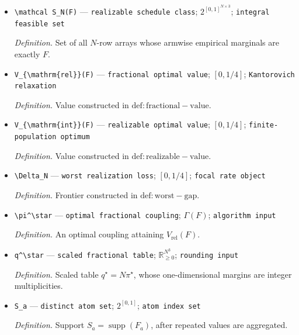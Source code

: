 \documentclass{article}
\begin{document}
\begin{itemize}
  \par\smallskip\noindent\emph{Definition.} Cost \(C(y)=(\sum_{a\in\mathbb A}c_a y_a)^2\).
  \item \texttt{\textbackslash{}\allowbreak{}mathcal S\_\allowbreak{}N(F)} --- \texttt{realizable schedule class}; \(2^{[0,1]^{N\times3}}\); \texttt{integral feasible set}
  \par\smallskip\noindent\emph{Definition.} Set of all \(N\)-row arrays whose armwise empirical marginals are exactly \(F\).
  \item \texttt{V\_\allowbreak{}\{\textbackslash{}\allowbreak{}mathrm\{rel\}\allowbreak{}\}\allowbreak{}(F)} --- \texttt{fractional optimal value}; \([0,1/4]\); \texttt{Kantorovich relaxation}
  \par\smallskip\noindent\emph{Definition.} Value constructed in \(\mathrm{def:fractional-value}\).
  \item \texttt{V\_\allowbreak{}\{\textbackslash{}\allowbreak{}mathrm\{int\}\allowbreak{}\}\allowbreak{}(F)} --- \texttt{realizable optimal value}; \([0,1/4]\); \texttt{finite-\allowbreak{}population optimum}
  \par\smallskip\noindent\emph{Definition.} Value constructed in \(\mathrm{def:realizable-value}\).
  \item \texttt{\textbackslash{}\allowbreak{}Delta\_\allowbreak{}N} --- \texttt{worst realization loss}; \([0,1/4]\); \texttt{focal rate object}
  \par\smallskip\noindent\emph{Definition.} Frontier constructed in \(\mathrm{def:worst-gap}\).
  \item \texttt{\textbackslash{}\allowbreak{}pi\textasciicircum{}\textbackslash{}\allowbreak{}star} --- \texttt{optimal fractional coupling}; \(\Gamma(F)\); \texttt{algorithm input}
  \par\smallskip\noindent\emph{Definition.} An optimal coupling attaining \(V_{\mathrm{rel}}(F)\).
  \item \texttt{q\textasciicircum{}\textbackslash{}\allowbreak{}star} --- \texttt{scaled fractional table}; \(\mathbb R_{\ge0}^{N^3}\); \texttt{rounding input}
  \par\smallskip\noindent\emph{Definition.} Scaled table \(q^\star=N\pi^\star\), whose one-dimensional margins are integer multiplicities.
  \item \texttt{S\_\allowbreak{}a} --- \texttt{distinct atom set}; \(2^{[0,1]}\); \texttt{atom index set}
  \par\smallskip\noindent\emph{Definition.} Support \(S_a=\operatorname{supp}(F_a)\), after repeated values are aggregated.

\end{itemize}
\end{document}
